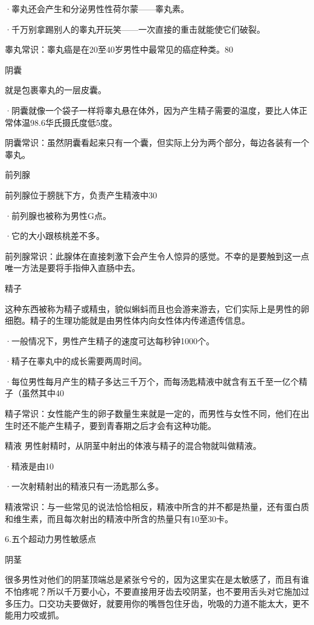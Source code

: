 \documentclass[12pt,UTF8,openany]{ctexbook}
\begin{document}
·睾丸还会产生和分泌男性性荷尔蒙——睾丸素。

·千万别拿踢别人的睾丸开玩笑——一次直接的重击就能使它们破裂。

睾丸常识：睾丸癌是在20至40岁男性中最常见的癌症种类。80%

阴囊

就是包裹睾丸的一层皮囊。

·阴囊就像一个袋子一样将睾丸悬在体外，因为产生精子需要的温度，要比人体正常体温98.6华氏摄氏度低5度。

阴囊常识：虽然阴囊看起来只有一个囊，但实际上分为两个部分，每边各装有一个睾丸。

前列腺

前列腺位于膀胱下方，负责产生精液中30%

·前列腺也被称为男性G点。

·它的大小跟核桃差不多。

前列腺常识：此腺体在直接刺激下会产生令人惊异的感觉。不幸的是要触到这一点唯一方法是要将手指伸入直肠中去。

精子

这种东西被称为精子或精虫，貌似蝌蚪而且也会游来游去，它们实际上是男性的卵细胞。精子的生理功能就是由男性体内向女性体内传递遗传信息。

·一般情况下，男性产生精子的速度可达每秒钟1000个。

·精子在睾丸中的成长需要两周时间。

·每位男性每月产生的精子多达三千万个，而每汤匙精液中就含有五千至一亿个精子（虽然其中40%

精子常识：女性能产生的卵子数量生来就是一定的，而男性与女性不同，他们在出生时还不能产生精子，要到青春期之后才会有这种功能。

精液
男性射精时，从阴茎中射出的体液与精子的混合物就叫做精液。

·精液是由10%

·一次射精射出的精液只有一汤匙那么多。

精液常识：与一些常见的说法恰恰相反，精液中所含的并不都是热量，还有蛋白质和维生素，而且每次射出的精液中所含的热量只有10至30卡。

6.五个超动力男性敏感点

阴茎

很多男性对他们的阴茎顶端总是紧张兮兮的，因为这里实在是太敏感了，而且有谁不怕疼呢？所以千万要小心，不要直接用牙齿去咬阴茎，也不要用舌头对它施加过多压力。口交功夫要做好，就要用你的嘴唇包住牙齿，吮吸的力道不能太大，更不能用力咬或抓。
\end{document}
